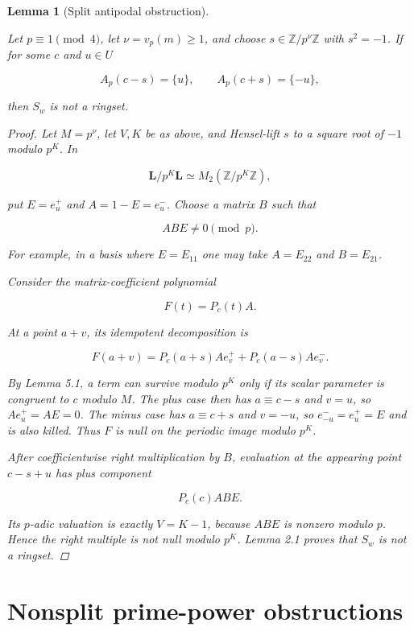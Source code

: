 \documentclass[11pt]{article}
\newtheorem{lemma}[theorem]{Lemma}
\numberwithin{equation}{section}
\begin{document}
\begin{lemma}[Split antipodal obstruction]
\label{lem:split-obstruction}

Let $p\equiv1\pmod4$, let $\nu=v_p(m)\ge1$, and choose
$s\in\mathbb Z/p^\nu\mathbb Z$ with $s^2=-1$. If for some $c$ and $u\in U$

\nopagebreak[4]
\[
A_p(c-s)=\{u\},
\qquad
A_p(c+s)=\{-u\},
\]

then $S_w$ is not a ringset.

\begin{proof}

Let $M=p^\nu$, let $V,K$ be as above, and Hensel-lift $s$ to a square root
of $-1$ modulo $p^K$. In

\nopagebreak[4]
\[
\mathbf L/p^K\mathbf L\simeq M_2(\mathbb Z/p^K\mathbb Z),
\]

put $E=e_u^+$ and $A=1-E=e_u^-$. Choose a matrix $B$ such that

\nopagebreak[4]
\[
ABE\ne0\pmod p.
\]

For example, in a basis where $E=E_{11}$ one may take
$A=E_{22}$ and $B=E_{21}$.

Consider the matrix-coefficient polynomial

\nopagebreak[4]
\[
F(t)=P_c(t)A.
\]

At a point $a+v$, its idempotent decomposition is

\nopagebreak[4]
\[
F(a+v)
=P_c(a+s)Ae_v^+ +P_c(a-s)Ae_v^-.
\]

By Lemma 5.1, a term can survive modulo $p^K$ only if its scalar parameter
is congruent to $c$ modulo $M$. The plus case then has
$a\equiv c-s$ and $v=u$, so $Ae_u^+=AE=0$. The minus case has
$a\equiv c+s$ and $v=-u$, so
$e_{-u}^-=e_u^+=E$ and is also killed. Thus $F$ is null on the periodic
image modulo $p^K$.

After coefficientwise right multiplication by $B$, evaluation at the
appearing point $c-s+u$ has plus component

\nopagebreak[4]
\[
P_c(c)ABE.
\]

Its $p$-adic valuation is exactly $V=K-1$, because $ABE$ is nonzero modulo
$p$. Hence the right multiple is not null modulo $p^K$. Lemma 2.1 proves
that $S_w$ is not a ringset.
\end{proof}

\end{lemma}


\section{Nonsplit prime-power obstructions}
\end{document}
